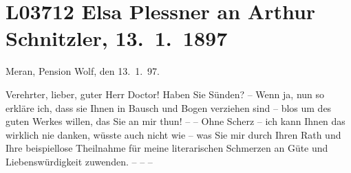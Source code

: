 

\section[Elsa Plessner an Arthur Schnitzler, 13. 1. 1897]{L03712 Elsa Plessner an Arthur Schnitzler, 13. 1. 1897}
\nopagebreak{}
\rehead{ }\normalsize\beginnumbering{}
\toendnotes[C]{\smallbreak\pagebreak[2]}
\toendnotes[C]{\smallbreak}
\pstart
           {\pb}Meran, Pension Wolf, den
                     13. 1. 97.\pend
           
\pstart{}Verehrter, lieber, guter Herr Doctor!\pend\vspace{0.5em}
\pstart
           Haben Sie Sünden? – Wenn ja, nun so erkläre ich, dass sie Ihnen in Bausch und Bogen
               verziehen sind – blos um des guten Werkes willen, das Sie an mir thun! – – Ohne
               Scherz – ich kann Ihnen das wirklich nie danken, wüsste auch nicht wie – was Sie mir
               durch Ihren Rath und Ihre beispiellose Theilnahme für meine literarischen Schmerzen
               an Güte und Liebenswürdigkeit zuwenden. – – –  \pend
           
